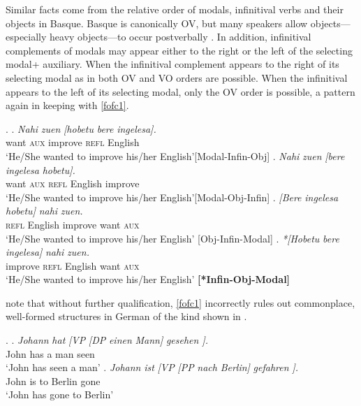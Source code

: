 \documentclass[output=paper]{langscibook}
\begin{document}
Similar facts come from the relative order of modals, infinitival verbs and their objects in Basque. Basque is canonically OV, but many speakers allow objects---especially heavy objects---to occur postverbally \citep{derijk1969, ortizdeurbina1989, elordieta2001}.  In addition, infinitival complements of modals may appear either to the right or the left of the selecting modal+ auxiliary.  When the infinitival complement appears to the right of its selecting modal as in \Next[a,b] both OV and VO orders are possible.  When the infinitival appears to the left of its selecting modal, only the OV order is possible, a pattern again in keeping with \protect\ref{fofc1}.


\ex.
\ag. \textit{Nahi} \textit{zuen} \textit{[hobetu} \textit{bere} \textit{ingelesa].}   \\
want \textsc{aux} improve \textsc{refl} English  \\
`He/She wanted to improve his/her English'\hfill{[Modal-Infin-Obj]}
\bg. \textit{Nahi} \textit{zuen} \textit{[bere} \textit{ingelesa} \textit{hobetu].}    \\
want \textsc{aux} \textsc{refl} English improve \\
`He/She wanted to improve his/her English'\hfill{[Modal-Obj-Infin]}
\cg. \textit{[Bere} \textit{ingelesa} \textit{hobetu]} \textit{nahi} \textit{zuen.} \\
 \textsc{refl} English improve want \textsc{aux} \\
 `He/She wanted to improve his/her English' \hfill{[Obj-Infin-Modal]}
\dg. \textit{*[Hobetu} \textit{bere} \textit{ingelesa]} \textit{nahi} \textit{zuen.}\\
improve \textsc{refl} English  want \textsc{aux} \\
`He/She wanted to improve his/her English'  \hfill{\textbf{[*Infin-Obj-Modal]}}



\cite{biberaueretal2014} note that without further qualification, \protect\ref{fofc1} incorrectly rules out commonplace, well-formed structures in German of the kind shown in \Next.

\exi.	\ag.	\textit{Johann} \textit{hat} \textit{[VP} \textit{[DP} \textit{einen} \textit{Mann]} \textit{gesehen ].} \\
	John	has	      \hspace{2mm} \hspace{2mm}      a        man	  seen \\
	`John has seen a man'
	\bg. 	\textit{Johann} \textit{ist} \textit{[VP} \textit{[PP} \textit{nach} \textit{Berlin]} \textit{gefahren ].}\\ 
		John is	\hspace{2mm} \hspace{2mm} to Berlin gone \\
		`John has gone to Berlin' \\
		\citep{biberaueretal2014}
\end{document}
